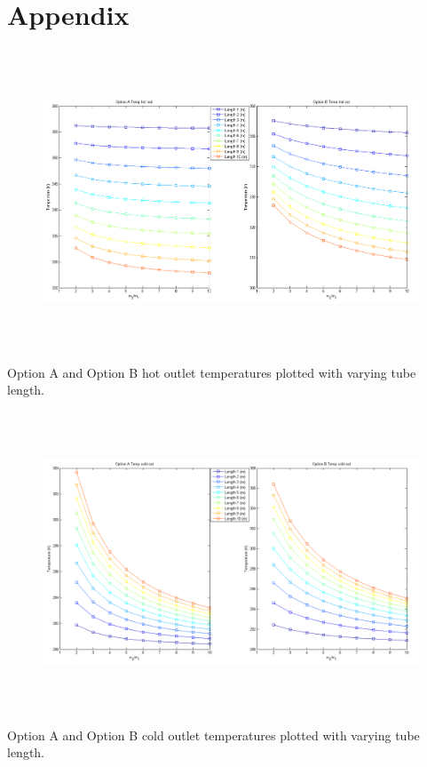 \section{Appendix}
%
\begin{figure}[H]
    \centering
    \includegraphics[height=3.5in]{pictures/part_4_temp_hot_length.png}
\end{figure}
%
\noindent
Option A and Option B hot outlet temperatures plotted with varying tube length.
%
\begin{figure}[H]
    \centering
    \includegraphics[height=3.5in]{pictures/part_4_temp_cold_length.png}
    \caption{}
\end{figure}
%
\noindent
Option A and Option B cold outlet temperatures plotted with varying tube length.
%




